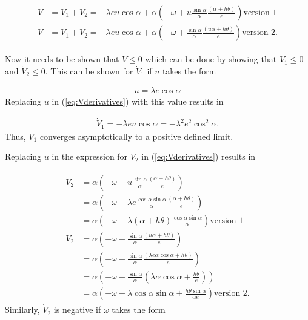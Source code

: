\begin{align}
\label{eq:lyapunovfunctionderivative}
\begin{split}
\dot{V} &= \dot{V}_1 + \dot{V}_2 = -\lambda e u\cos\alpha + \alpha\left(-\omega+u\frac{\sin\alpha}{\alpha}\frac{(\alpha+h\theta)}{e}\right) \text{version 1} \\
\dot{V} &= \dot{V}_1 + \dot{V}_2 = -\lambda e u\cos\alpha + \alpha\left(-\omega+\frac{\sin\alpha}{\alpha}\frac{(u\alpha+h\theta)}{e}\right) \text{version 2}.
\end{split}
\end{align}

Now it needs to be shown that $\dot{V}\leq0$ which can be done by showing that $\dot{V}_1\leq0$ and $\dot{V}_2\leq0$. This can be shown for $\dot{V}_1$ if $u$ takes the form

\begin{align}
\label{eq:lyapunovu}
u = \lambda e\cos\alpha
\end{align}
Replacing $u$ in (\ref{eq:Vderivatives}) with this value results in

\begin{align}
\label{eq:V1dotfinal}
\dot{V}_1 = -\lambda eu\cos\alpha = -\lambda^2e^2\cos^2\alpha.
\end{align}
Thus, $V_1$ converges asymptotically to a positive defined limit.

Replacing $u$ in the expression for $\dot{V}_2$ in (\ref{eq:Vderivatives}) results in

\begin{align}
\label{eq:V2dotreplaceu}
\begin{split}
\dot{V}_2 &= \alpha\left(-\omega+u\frac{\sin\alpha}{\alpha}\frac{(\alpha+h\theta)}{e}\right) \\
&= \alpha\left(-\omega+\lambda e\frac{\cos\alpha\sin\alpha}{\alpha}\frac{(\alpha+h\theta)}{e}\right) \\
&= \alpha\left(-\omega+\lambda(\alpha+h\theta)\frac{\cos\alpha\sin\alpha}{\alpha}\right) \text{version 1} \\
\dot{V}_2 &= \alpha\left(-\omega+\frac{\sin\alpha}{\alpha}\frac{(u\alpha+h\theta)}{e}\right) \\
&= \alpha\left(-\omega+\frac{\sin\alpha}{\alpha}\frac{(\lambda e\alpha\cos\alpha+h\theta)}{e}\right) \\
&= \alpha\left(-\omega+\frac{\sin\alpha}{\alpha}\left(\lambda\alpha\cos\alpha+\frac{h\theta}{e}\right)\right) \\
&= \alpha\left(-\omega+\lambda\cos\alpha\sin\alpha + \frac{h\theta\sin\alpha}{\alpha e}\right) \text{version 2}.
\end{split}
\end{align}
Similarly, $\dot{V}_2$ is negative if $\omega$ takes the form

